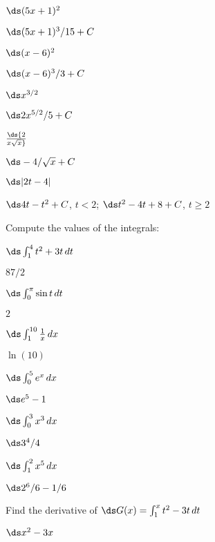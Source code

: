 \begin{theorem}
\begin{exercises}
\exercise $\ds (5x+1)^2$
\begin{answer} $\ds (5x+1)^3/15+C$
\end{answer}

\exercise $\ds (x-6)^2$
\begin{answer} $\ds (x-6)^3/3+C$
\end{answer}

\exercise $\ds x^{3/2}$
\begin{answer} $\ds 2x^{5/2}/5+C$
\end{answer}

\exercise $\ds {2\over x\sqrt x}$
\begin{answer} $\ds -4/\sqrt{x}+C$
\end{answer}

\exercise $\ds |2t-4|$
\begin{answer} $\ds 4t-t^2+C$, $t<2$; $\ds t^2-4t+8+C$, $t\ge 2$
\end{answer}

\endtwocol

\noindent
Compute the values of the integrals:

\twocol

\exercise $\ds \int_1^4 t^2+3t\,dt$
\begin{answer} $87/2$
\end{answer}

\exercise $\ds \int_0^\pi \sin t\,dt$
\begin{answer} $2$
\end{answer}

\iflatetranscendentals
\else
\exercise $\ds \int_1^{10} {1\over x}\,dx$
\begin{answer} $\ln(10)$
\end{answer}

\exercise $\ds \int_0^5 e^x\,dx$
\begin{answer} $\ds e^5-1$
\end{answer}
\fi

\exercise $\ds \int_0^3 x^3\,dx$
\begin{answer} $\ds 3^4/4$
\end{answer}

\exercise $\ds \int_1^2 x^5\,dx$
\begin{answer} $\ds 2^6/6 -1/6$
\end{answer}

\endtwocol

\msk
\exercise Find the derivative of $\ds G(x)=\int_1^x t^2-3t\,dt$
\begin{answer} $\ds x^2-3x$
\end{answer}


\end{exercises}
\end{theorem}
